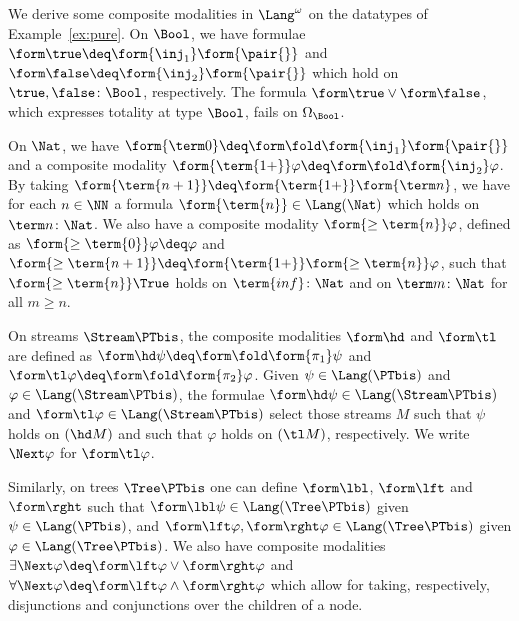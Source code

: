 \begin{example}
\label{ex:form:mod}
We derive some composite modalities in $\Lang^\omega$ on the datatypes of
Example~\ref{ex:pure}.
On $\Bool$, we have formulae $\form\true \deq \form{\inj_1}\form{\pair{}}$
and $\form\false \deq \form{\inj_2}\form{\pair{}}$ which hold
on $\true, \false \colon \Bool$, respectively.
The formula $\form\true \lor \form\false$,
which expresses totality at type $\Bool$,
fails on $\Omega_\Bool$.

On $\Nat$, we have $\form{\term 0} \deq \form\fold \form{\inj_1} \form{\pair{}}$
and a composite modality
$\form{\term{1+}}\varphi \deq \form\fold \form{\inj_2}\varphi$.
By taking $\form{\term{n+1}} \deq \form{\term{1+}}\form{\term n}$,
we have for each $n \in \NN$ a formula $\form{\term{n}} \in \Lang(\Nat)$
which holds on $\term n \colon \Nat$.
We also have a composite modality $\form{\geq \term{n}} \varphi$,
defined as $\form{\geq \term{0}}\varphi \deq \varphi$
and $\form{\geq \term{n+1}} \deq \form{\term{1+}}\form{\geq \term{n}} \varphi$,
such that $\form{\geq \term{n}}\True$
holds on $\term{inf} \colon \Nat$ and on $\term m \colon \Nat$ for all $m \geq n$.

On streams $\Stream\PTbis$, 
the composite modalities $\form\hd$ and $\form\tl$
are defined as $\form\hd \psi \deq \form\fold \form{\pi_1} \psi$
and $\form\tl \varphi \deq \form\fold \form{\pi_2} \varphi$.
Given $\psi \in \Lang(\PTbis)$ and $\varphi \in \Lang(\Stream\PTbis)$,
the formulae $\form\hd\psi \in \Lang(\Stream\PTbis)$
and $\form\tl\varphi \in \Lang(\Stream\PTbis)$
select those streams $M$ such that $\psi$ holds on $(\hd M)$
and such that $\varphi$ holds on $(\tl M)$, respectively.
We write $\Next\varphi$ for $\form\tl\varphi$.

Similarly, on trees $\Tree\PTbis$
one can define $\form\lbl$, $\form\lft$ and $\form\rght$
such that
$\form\lbl\psi \in \Lang(\Tree\PTbis)$
given $\psi \in \Lang(\PTbis)$,
and
$\form\lft\varphi, \form\rght\varphi \in \Lang(\Tree\PTbis)$
given $\varphi \in \Lang(\Tree\PTbis)$.
We also have composite modalities
$\exists\Next \varphi \deq \form\lft \varphi \lor \form\rght\varphi$
and
$\forall\Next \varphi \deq \form\lft \varphi \land \form\rght\varphi$
which allow for taking, respectively,
disjunctions and conjunctions over the children of a node.
\lipicsEnd
\end{example}



